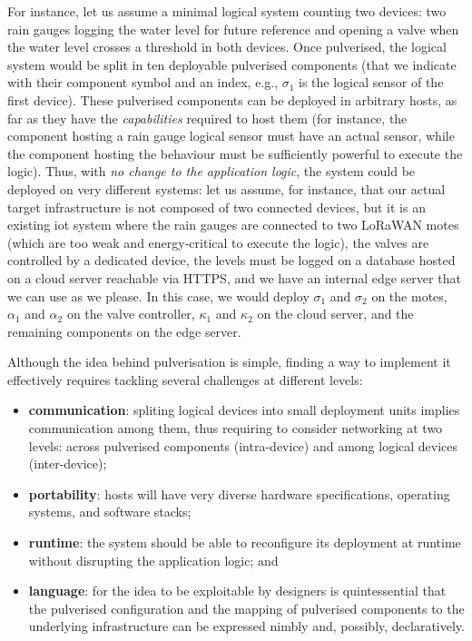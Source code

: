 \documentclass[conference]{IEEEtran}
\begin{document}
For instance, let us assume a minimal logical system counting two devices:
two rain gauges logging the water level for future reference
and opening a valve when the water level crosses a threshold in both devices.
%
Once pulverised, the logical system would be split in ten deployable pulverised components
(that we indicate with their component symbol and an index, e.g., $\sigma_1$ is the logical sensor of the first device).
%
These pulverised components can be deployed in arbitrary hosts,
as far as they have the \emph{capabilities} required to host them
(for instance, the component hosting a rain gauge logical sensor must have an actual sensor,
while the component hosting the behaviour must be sufficiently powerful to execute the logic).
%
Thus, with \emph{no change to the application logic},
the system could be deployed on very different systems:
let us assume, for instance,
that our actual target infrastructure is not composed of two connected devices,
but it is an existing \ac{iot} system
where the rain gauges are connected to two LoRaWAN motes
(which are too weak and energy-critical to execute the logic),
the valves are controlled by a dedicated device,
the levels must be logged on a database hosted on a cloud server reachable via HTTPS,
and we have an internal edge server that we can use as we please.
%
In this case, we would deploy $\sigma_1$ and $\sigma_2$ on the motes,
$\alpha_1$ and $\alpha_2$ on the valve controller,
$\kappa_1$ and $\kappa_2$ on the cloud server,
and the remaining components on the edge server.

Although the idea behind pulverisation is simple,
finding a way to implement it effectively requires tackling several challenges at different levels:
\begin{itemize}
    \item \textbf{communication}: spliting logical devices into small deployment units implies communication among them,
    thus requiring to consider networking at two levels:
    across pulverised components (intra-device) and among logical devices (inter-device);
    \item \textbf{portability}: hosts will have very diverse hardware specifications, operating systems, and software stacks;
    \item \textbf{runtime}: the system should be able to reconfigure its deployment at runtime without disrupting the application logic; and
    \item \textbf{language}: for the idea to be exploitable by designers is quintessential that
    the pulverised configuration
    and the mapping of pulverised components to the underlying infrastructure
    can be expressed nimbly and, possibly, declaratively.
\end{itemize}
\end{document}
